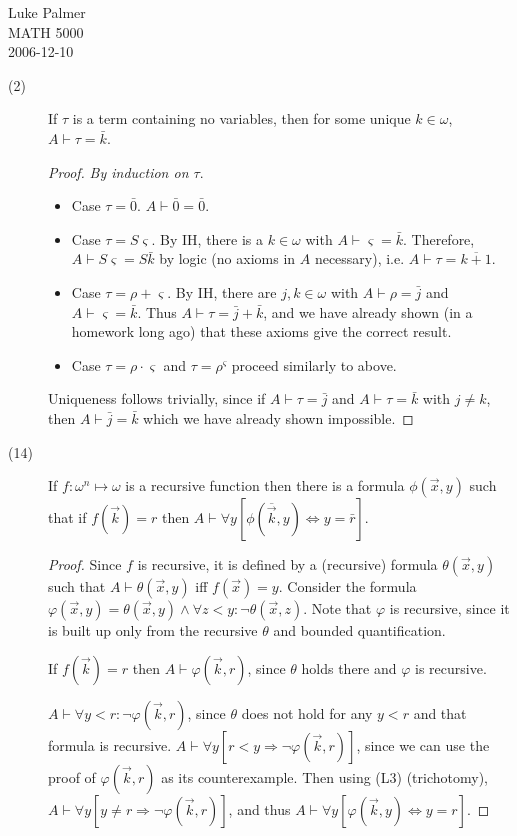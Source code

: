 \documentclass[12pt]{article}
\newcommand{\proves}[0]{\vdash}
\begin{document}
\noindent Luke Palmer \\
MATH 5000 \\
2006-12-10

\begin{description}
\item[(2)] If $\tau$ is a term containing no variables, then for some
unique $k \in \omega$, $A \proves \tau = \bar{k}$.
  \begin{proof}
  \textit{By induction on $\tau$}.
  \begin{itemize}
    \item Case $\tau = \bar{0}$.  $A \proves \bar{0} = \bar{0}$.
	\item Case $\tau = S\varsigma$.  By IH, there is a $k \in \omega$
	with $A \proves \varsigma = \bar{k}$.  Therefore, $A \proves
	S\varsigma = S\bar{k}$ by logic (no axioms in $A$ necessary), i.e.
	$A \proves \tau = \overline{k+1}$.
	\item Case $\tau = \rho + \varsigma$.  By IH, there are $j,k \in
	\omega$ with $A \proves \rho = \bar{j}$ and $A \proves \varsigma =
	\bar{k}$.  Thus $A \proves \tau = \bar{j} + \bar{k}$, and we have
	already shown (in a homework long ago) that these axioms give the
	correct result.
	\item Case $\tau = \rho \cdot \varsigma$ and $\tau = \rho^\varsigma$
	proceed similarly to above.
  \end{itemize}

  Uniqueness follows trivially, since if $A \proves \tau = \bar{j}$ and
  $A \proves \tau = \bar{k}$ with $j \ne k$, then $A \proves \bar{j} =
  \bar{k}$ which we have already shown impossible.
  \end{proof}

\item[(14)] If $f: \omega^n \mapsto \omega$ is a recursive function then
  there is a formula $\phi(\vec{x}, y)$ such that if $f(\vec{k}) = r$ then
  $A \proves \forall y [\phi(\overline{\vec{k}}, y) \Leftrightarrow y =
  \bar{r}]$.
  \begin{proof}
  Since $f$ is recursive, it is defined by a (recursive) formula
  $\theta(\vec{x}, y)$ such that $A \proves \theta(\vec{x},y)$ iff
  $f(\vec{x}) = y$.  Consider the formula $\varphi(\vec{x},y) =
  \theta(\vec{x}, y) \wedge \forall z<y: \neg \theta(\vec{x},z)$.  Note
  that $\varphi$ is recursive, since it is built up only from the
  recursive $\theta$ and bounded quantification.

  If $f(\vec{k}) = r$ then $A \proves \varphi(\vec{k}, r)$, since
  $\theta$ holds there and $\varphi$ is recursive.

  $A \proves \forall y < r: \neg \varphi(\vec{k}, r)$, since
  $\theta$ does not hold for any $y < r$ and that formula is recursive.
  $A \proves \forall y [r < y \Rightarrow \neg \varphi(\vec{k}, r)]$,
  since we can use the proof of $\varphi(\vec{k}, r)$ as its
  counterexample.  Then using (L3) (trichotomy), $A \proves \forall y [y
  \ne r \Rightarrow \neg \varphi(\vec{k}, r)]$, and thus $A \proves
  \forall y [\varphi(\vec{k}, y) \Leftrightarrow y = r]$.
  \end{proof}
\end{description}
\end{document}
